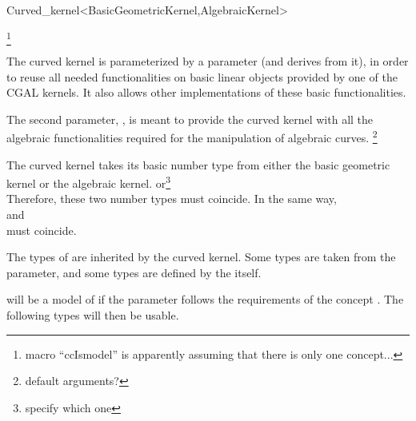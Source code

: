 \begin{ccRefClass}{Curved_kernel<BasicGeometricKernel,AlgebraicKernel>}

\ccDefinition


\footnote{macro ``ccIsmodel'' is apparently assuming that there is only one concept...}


\ccParameters

The curved kernel is parameterized by a  parameter
(and derives from it), in order to reuse all needed functionalities on
basic linear objects provided by one of the CGAL kernels. It also
allows other implementations of these basic functionalities.

The second parameter, , is meant to provide the
curved kernel with all the algebraic functionalities required for the
manipulation of algebraic curves. 
\footnote{default arguments?}

\ccInheritsFrom


\ccTypes

\ccThreeToTwo

The curved kernel takes its basic number type from either the basic geometric kernel or the algebraic kernel. 
or\footnote{specify which one}\\
Therefore, these two number types must coincide. In the same way,\\
and\\
must coincide. 


The types of  are inherited by the curved kernel.
Some types are taken from the  parameter, and
some types are defined by the  itself.

 will be a model of  if the 
 parameter follows the requirements of the 
concept . The following types will then be usable. 

\ccGlue
{}
\ccGlue
{}


\end{ccRefClass}
